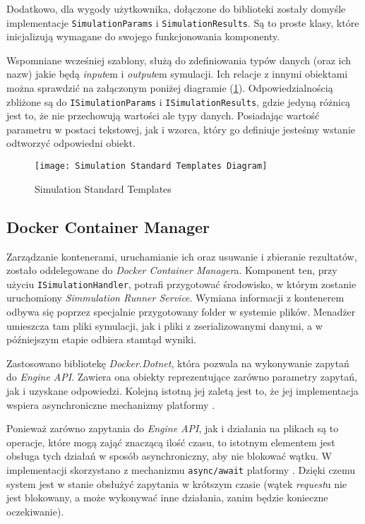 \par Dodatkowo, dla wygody użytkownika, dołączone do biblioteki zostały domyśle implementacje \texttt{SimulationParams} i \texttt{SimulationResults}. Są to proste klasy, które inicjalizują wymagane do swojego funkcjonowania komponenty.

\par Wspomniane wcześniej szablony, służą do zdefiniowania typów danych (oraz ich nazw) jakie będą \emph{input}em i \emph{output}em symulacji. Ich relacje z innymi obiektami można sprawdzić na załączonym poniżej diagramie (\ref{fig:simulationStandardTemplates}). Odpowiedzialnością zbliżone są do \texttt{ISimulationParams} i \texttt{ISimulationResults}, gdzie jedyną różnicą jest to, że nie przechowują wartości ale typy danych. Posiadając wartość parametru w postaci tekstowej, jak i wzorca, który go definiuje jesteśmy wstanie odtworzyć odpowiedni obiekt.

\begin{figure}[H]
	\texttt{[image: Simulation Standard Templates Diagram]}
	\caption{Simulation Standard Templates}
	\label{fig:simulationStandardTemplates}
\end{figure}

\subsection{Docker Container Manager}
\label{sec:dockerContainerManager}

\par Zarządzanie kontenerami, uruchamianie ich oraz usuwanie i zbieranie rezultatów, zostało oddelegowane do \emph{Docker Container Manager}a. Komponent ten, przy użyciu \texttt{ISimulationHandler}, potrafi przygotować środowisko, w którym zostanie uruchomiony \emph{Simmulation Runner Service}. Wymiana informacji z kontenerem odbywa się poprzez specjalnie przygotowany folder w systemie plików. Menadżer umieszcza tam pliki symulacji, jak i pliki z zserializowanymi danymi, a w późniejszym etapie odbiera stamtąd wyniki.

\par Zastosowano bibliotekę \emph{Docker.Dotnet}, która pozwala na wykonywanie zapytań do \emph{\docker{} Engine API}. Zawiera ona obiekty reprezentujące zarówno parametry zapytań, jak i uzyskane odpowiedzi. Kolejną istotną jej zaletą jest to, że jej implementacja wspiera asynchroniczne mechanizmy platformy \emph{\dotnet{}}.

\par Ponieważ zarówno zapytania do \emph{\docker{} Engine API}, jak i działania na plikach są to operacje, które mogą zająć znaczącą ilość czasu, to istotnym elementem jest obsługa tych działań w sposób asynchroniczny, aby nie blokować wątku. W implementacji skorzystano z mechanizmu \texttt{async/await} platformy \emph{\dotnet{}}. Dzięki czemu system jest w stanie obsłużyć zapytania w krótszym czasie (wątek \emph{request}u nie jest blokowany, a może wykonywać inne działania, zanim będzie konieczne oczekiwanie).

